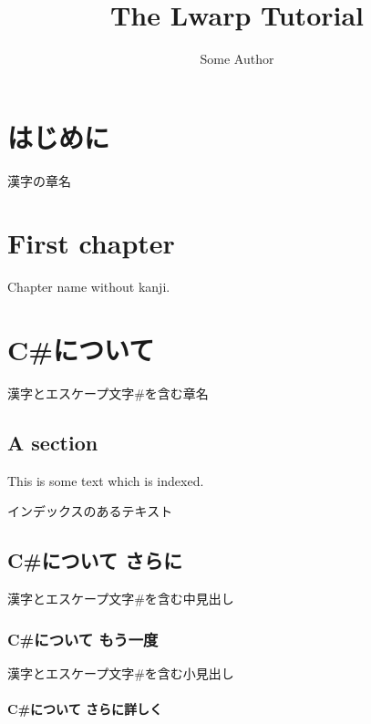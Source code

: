 \documentclass{book}
\title{The Lwarp Tutorial}
\author{Some Author}
\begin{document}
\maketitle                      %


\tableofcontents                %
\listoffigures

\chapter{はじめに}

漢字の章名

\chapter{First chapter}

Chapter name without kanji.

\chapter{C\#について}

漢字とエスケープ文字\#を含む章名

\section{A section}

This is some text which is indexed.

インデックスのあるテキスト

\section{C\#について さらに}

漢字とエスケープ文字\#を含む中見出し

\subsection{C\#について もう一度}

漢字とエスケープ文字\#を含む小見出し

\subsubsection{C\#について さらに詳しく}
\end{document}
